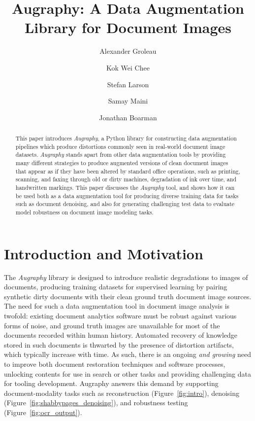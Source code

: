 \documentclass[runningheads]{llncs}
\begin{document}
\title{Augraphy: A Data Augmentation Library for Document Images}
\author{Alexander Groleau \and
Kok Wei Chee \and
Stefan Larson \and
Samay Maini \and
Jonathan Boarman}



\maketitle

\begin{abstract}
This paper introduces \emph{Augraphy}, a Python library for constructing data augmentation pipelines which produce distortions commonly seen in real-world document image datasets.
\emph{Augraphy} stands apart from other data augmentation tools by providing many different strategies to produce augmented versions of clean document images that appear as if they have been altered by standard office operations, such as printing, scanning, and faxing through old or dirty machines, degradation of ink over time, and handwritten markings.
This paper discusses the \emph{Augraphy} tool, and shows how it can be used both as a data augmentation tool for producing diverse training data for tasks such as document denoising, and also for generating challenging test data to evaluate model robustness on document image modeling tasks.

\end{abstract}

\section{Introduction and Motivation}

The \emph{Augraphy} library is designed to introduce realistic degradations to images of documents, producing training datasets for supervised learning by pairing synthetic dirty documents with their clean ground truth document image sources. The need for such a data augmentation tool in document image analysis is twofold: existing document analytics software must be robust against various forms of noise, and ground truth images are unavailable for most of the documents recorded within human history. Automated recovery of knowledge stored in such documents is thwarted by the presence of distortion artifacts, which typically increase with time. As such, there is an ongoing \textit{and growing} need to improve both document restoration techniques and software processes, unlocking contents for use in search or other tasks and providing challenging data for tooling development. Augraphy answers this demand by supporting document-modality tasks such as reconstruction (Figure~\ref{fig:intro}), denoising (Figure~\ref{fig:shabbypages_denoising}), and robustness testing (Figure~\ref{fig:ocr_output}).
\end{document}

